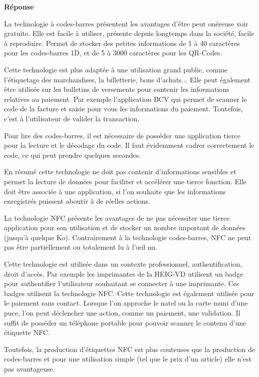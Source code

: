 \documentclass[francais,12pt]{article}
\begin{document}
	{\color[rgb]{0,0.5,0.23}\textbf{Réponse}}
	
	La technologie à codes-barres présentent les avantages d'être peut onéreuse voir gratuite. Elle est facile à utiliser, présente depuis longtemps dans la société, facile à reproduire. Permet de stocker des petites informations de 1 à 40 caractères pour les codes-barres 1D, et de 5 à 3000 caractères pour les QR-Codes. 

	Cette technologie est plus adaptée à une utilisation grand public, comme l’étiquetage des marchandises, la billetterie, bons d'achats... 
	Elle peut également être utilisée sur les bulletins de versements pour contenir les informations relatives au paiement. Par exemple l'application BCV qui permet de scanner le code de la facture et saisie pour vous les informations du paiement. Toutefois, c'est à l'utilisateur de valider la transaction.
	
	Pour lire des codes-barres, il est nécessaire de posséder une application tierce pour la lecture et le décodage du code. Il faut évidemment cadrer correctement le code, ce qui peut prendre quelques secondes.
	
	En résumé cette technologie ne doit pas contenir d'informations sensibles et permet la lecture de données pour faciliter et accélérer une tierce fonction. Elle doit être associée à une application, si l'on souhaite que les informations enregistrés puissent aboutir à de réelles actions.
	
	La technologie NFC présente les avantages de ne pas nécessiter une tierce application pour son utilisation et de stocker un nombre important de données (jusqu'à quelque Ko). Contrairement à la technologie codes-barres, NFC ne peut pas être partiellement ou totalement lu à l'œil nu. 
	
	Cette technologie est utilisée dans un contexte professionnel, authentification, droit d'accès. Par exemple les imprimantes de la HEIG-VD utilisent un badge pour authentifier l'utilisateur souhaitant se connecter à une imprimante. Ces badges utilisent la technologie NFC. Cette technologie est également utilisée pour le paiement sans contact. Lorsque l'on approche le natel ou la carte muni d'une puce, l'on peut déclencher une action, comme un paiement, une validation.	
	Il suffit de posséder un téléphone portable pour pouvoir scanner le contenu d'une étiquette NFC. 
	
	Toutefois, la production d'étiquettes NFC est plus couteuses que la production de codes-barres et pour une utilisation simple (tel que le prix d'un article) elle n'est pas avantageuse. 
	
\end{document}

